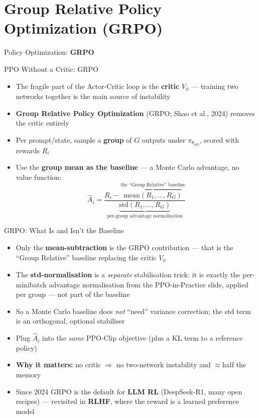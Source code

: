 \section{Group Relative Policy Optimization (GRPO)}
\begin{frame}{}
    \LARGE Policy Optimization: \textbf{GRPO}
\end{frame}

\begin{frame}{PPO Without a Critic: GRPO}
\begin{itemize}
    \item The fragile part of the Actor-Critic loop is the \textbf{critic} $V_\phi$ --- training two networks together is the main source of instability
    \item \textbf{Group Relative Policy Optimization} (GRPO; Shao et al., 2024) removes the critic entirely
    \pause
    \item Per prompt/state, sample a \textbf{group} of $G$ outputs under $\pi_{\theta_\text{old}}$, scored with rewards $R_i$
    \item Use the \textbf{group mean as the baseline} --- a Monte Carlo advantage, no value function:
    $$\hat{A}_i = \frac{R_i - \overbrace{\mathrm{mean}(R_1,\dots,R_G)}^{\text{the ``Group Relative'' baseline}}}{\underbrace{\mathrm{std}(R_1,\dots,R_G)}_{\text{per-group advantage normalisation}}}$$
\end{itemize}
\end{frame}

\begin{frame}{GRPO: What Is and Isn't the Baseline}
\begin{itemize}
    \item Only the \textbf{mean-subtraction} is the GRPO contribution --- that is the ``Group Relative'' baseline replacing the critic $V_\phi$
    \item The \textbf{std-normalisation} is a \emph{separate} stabilisation trick: it is exactly the per-minibatch advantage normalisation from the PPO-in-Practice slide, applied per group --- not part of the baseline
    \item So a Monte Carlo baseline does \emph{not} ``need'' variance correction; the std term is an orthogonal, optional stabiliser
    \pause
    \item Plug $\hat{A}_i$ into the \emph{same} PPO-Clip objective (plus a KL term to a reference policy)
    \item \textbf{Why it matters:} no critic $\Rightarrow$ no two-network instability and $\approx$half the memory
    \item Since 2024 GRPO is the default for \textbf{LLM RL} (DeepSeek-R1, many open recipes) --- revisited in \textbf{RLHF}, where the reward is a learned preference model
\end{itemize}
\end{frame}
